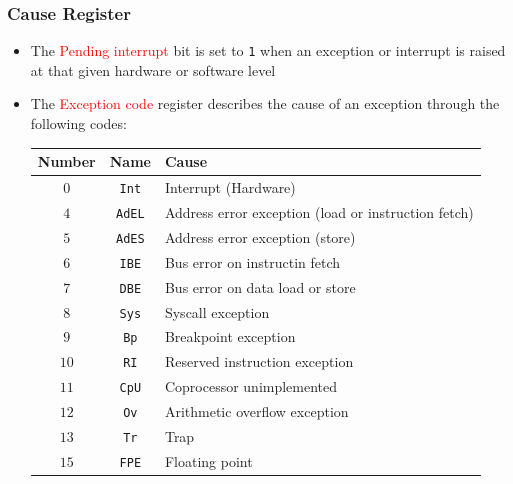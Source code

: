 \documentclass{beamer}
\begin{document}
\begin{frame}%
\frametitle{Cause Register}

\scriptsize

\begin{itemize}

\item The \textcolor{red}{Pending interrupt} bit is set to \texttt{1} when an exception or interrupt is raised at that
  given hardware or software level

\item The \textcolor{red}{Exception code} register describes the cause of an exception through the following codes:

\scriptsize

\begin{center}
\begin{tabular}{|c|c|p{7cm}|}
\hline
Number & Name & Cause\\
\hline
\hline
$0$ & \texttt{Int} & Interrupt (Hardware)\\
\hline
$4$ & \texttt{AdEL} & Address error exception (load or instruction fetch)\\
\hline
$5$ & \texttt{AdES} & Address error exception (store)\\
\hline
$6$ & \texttt{IBE} & Bus error on instructin fetch\\
\hline
$7$ & \texttt{DBE} & Bus error on data load or store\\
\hline
$8$ & \texttt{Sys} & Syscall exception\\
\hline
$9$ & \texttt{Bp} & Breakpoint exception\\
\hline
$10$ & \texttt{RI} & Reserved instruction exception\\
\hline
$11$ & \texttt{CpU} & Coprocessor unimplemented\\
\hline
$12$ & \texttt{Ov} & Arithmetic overflow exception\\
\hline
$13$ & \texttt{Tr} & Trap\\
\hline
$15$ & \texttt{FPE} & Floating point\\
\hline
\end{tabular}
\end{center}

\end{itemize}

\end{frame}
\end{document}
